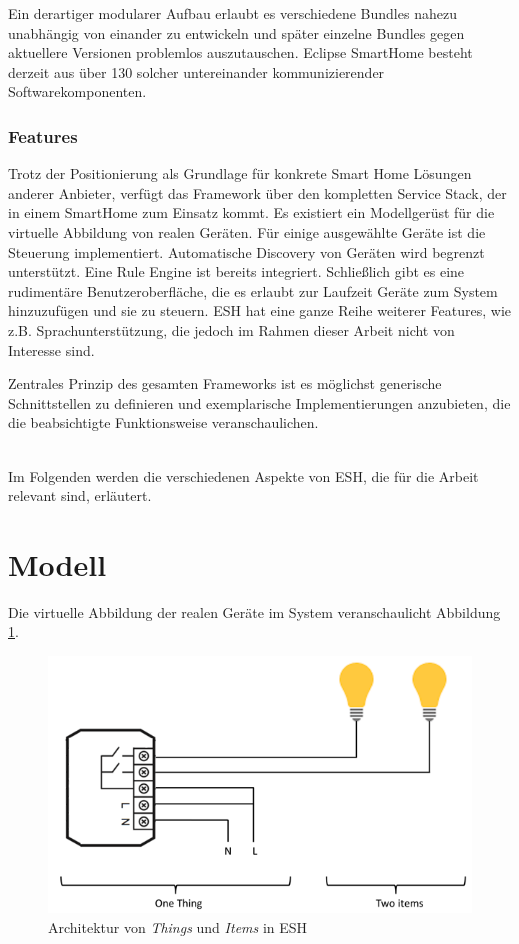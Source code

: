Ein derartiger modularer Aufbau erlaubt es verschiedene Bundles nahezu unabhängig von einander zu entwickeln und später einzelne Bundles gegen aktuellere Versionen problemlos auszutauschen. Eclipse SmartHome besteht derzeit aus über 130 solcher untereinander kommunizierender Softwarekomponenten.


\subsubsection{Features}
Trotz der Positionierung als Grundlage für konkrete Smart Home Lösungen anderer Anbieter, verfügt das Framework über den kompletten Service Stack, der in einem SmartHome zum Einsatz kommt. Es existiert ein Modellgerüst für die virtuelle Abbildung von realen Geräten. Für einige ausgewählte Geräte ist die Steuerung implementiert. Automatische Discovery von Geräten wird begrenzt unterstützt. Eine Rule Engine ist bereits integriert. Schließlich gibt es eine rudimentäre Benutzeroberfläche, die es erlaubt zur Laufzeit Geräte zum System hinzuzufügen und sie zu steuern. ESH hat eine ganze Reihe weiterer Features, wie z.B. Sprachunterstützung, die jedoch im Rahmen dieser Arbeit nicht von Interesse sind. 

Zentrales Prinzip des gesamten Frameworks ist es möglichst generische Schnittstellen zu definieren und exemplarische Implementierungen anzubieten, die die beabsichtigte Funktionsweise veranschaulichen. 

\\
Im Folgenden werden die verschiedenen Aspekte von ESH, die für die Arbeit relevant sind, erläutert.

\section{Modell}
Die virtuelle Abbildung der realen Geräte im System veranschaulicht Abbildung \ref{fig:esh_model}.

\begin{figure}[h]
	\centering
	\includegraphics[width=\textwidth]{bilder/esh_model}
	\caption{Architektur von \textit{Things} und \textit{Items} in ESH}
	\label{fig:esh_model}
\end{figure}


